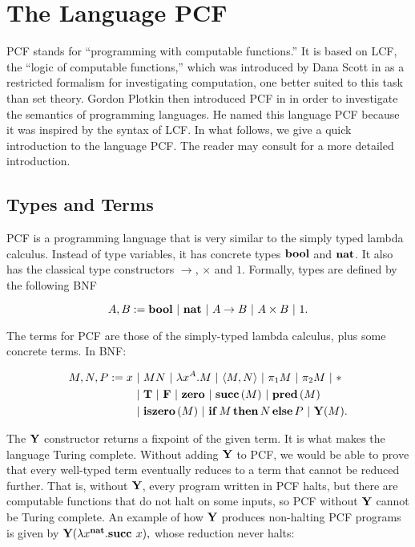 
\section{The Language PCF}

PCF stands for ``programming with computable functions.'' It is based on LCF, the ``logic of computable functions,'' which was introduced by Dana Scott in \cite{LCF} as a restricted formalism for investigating computation, one better suited to this task than set theory. Gordon Plotkin then introduced PCF in \cite{PCF} in order to investigate the semantics of programming languages. He named this language PCF because it was inspired by the syntax of LCF. In what follows, we give a quick introduction to the language PCF. The reader may consult \cite{LambdaNotes} for a more detailed introduction.

\subsection{Types and Terms}

PCF is a programming language that is very similar to the simply typed lambda calculus. Instead of type variables, it has concrete types $\mathbf{bool}$ and $\mathbf{nat}$. It also has the classical type constructors $\to$, $\times$ and $1$. Formally, types are defined by the following BNF

\[ A, B := \mathbf{bool} \ \mathbf{|}\  \mathbf{nat} \ \mathbf{|}\  A\to B \ \mathbf{|}\  A\times B \ \mathbf{|}\  1. \]

The terms for PCF are those of the simply-typed lambda calculus, plus some concrete terms. In BNF:

\begin{align*}
    M, N, P := x &\ \mathbf{|}\  MN \ \mathbf{|}\  \lambda x^A.M \ \mathbf{|}\  \langle M, N\rangle \ \mathbf{|}\  \pi_1M \ \mathbf{|}\  \pi_2M \ \mathbf{|}\  * \\
    &\ \mathbf{|}\  \mathbf{T} \ \mathbf{|}\  \mathbf{F} \ \mathbf{|}\  \mathbf{zero} \ \mathbf{|}\  \mathbf{succ}\,(M) \ \mathbf{|}\  \mathbf{pred}\,(M) \\
    &\ \mathbf{|}\  \mathbf{iszero}\,(M) \ \mathbf{|}\  \mathbf{if}\,M\,\mathbf{then}\,N\,\mathbf{else}\,P \ \mathbf{|}\  \mathbf{Y}(M).
\end{align*}

The $\mathbf{Y}$ constructor returns a fixpoint of the given term. It is what makes the language Turing complete. Without adding $\textbf{Y}$ to PCF, we would be able to prove that every well-typed term eventually reduces to a term that cannot be reduced further. That is, without $\textbf{Y}$, every program written in PCF halts, but there are computable functions that do not halt on some inputs, so PCF without $\textbf{Y}$ cannot be Turing complete. An example of how $\textbf{Y}$ produces non-halting PCF programs is given by $\textbf{Y}(\lambda x^{\textbf{nat}}. \textbf{succ } x),$ whose reduction never halts:

